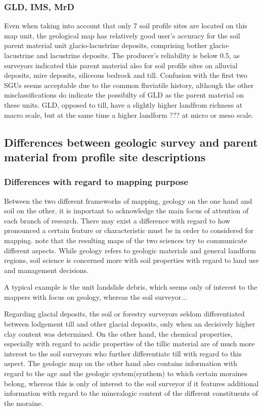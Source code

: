 \documentclass[preprint,12pt,authoryear]{elsarticle}
\begin{document}
\subsubsection{GLD, IMS, MrD}
Even when taking into account that only 7 soil profile sites are located on this map unit, the geological map has relatively good user's accuracy for the soil parent material unit glacio-lacustrine deposits, comprising bother glacio-lacustrine and lacustrine deposits. The producer's reliability is below 0.5, as surveyors indicated this parent material also for soil profile sites on alluvial deposits,  mire deposits, siliceous bedrock and till. Confusion with the first two SGUs seems acceptable due to the common fluviatile history, although the other misclassifications do indicate the possibilty of GLD as the parent material on these units.
GLD, opposed to till, have a slightly higher landfrom richness at macro scale, but at the same time a higher landform ???   at micro or meso scale. 
\subsection{Differences between geologic survey and parent material from profile site descriptions} 

\subsubsection{Differences with regard to mapping purpose}
Between the two different frameworks of mapping, geology on the one hand and soil on the other, it is important to acknowledge the main focus of attention of each branch of research. There may exist a difference with regard to how pronounced a certain feature or characteristic must be in order to considered for mapping. \cite{Miller2015a} note that the resulting maps of the two sciences try to communicate different aspects. While geology refers to geologic materials and general landform regions, soil science is concerned more with soil properties with regard to land use and management decisions.

A typical example is the unit landslide debris, which seems only of interest to the mappers with focus on geology, whereas the soil surveyor...

Regarding glacial deposits, the soil or forestry surveyors seldom differentiated between lodgement till and other glacial deposits, only when an decisively higher clay content was determined. On the other hand, the chemical properties, especially with regard to acidic properties of the tillic material are of much more interest to the soil surveyors who further differentiate till with regard to this aspect. The geologic map on the other hand also contains information with regard to the age and the geologic system(synthem) to which certain moraines belong, whereas this is only of interest to the soil surveyor if it features additional information with regard to the mineralogic content of the different constituents of the moraine.
\end{document}
